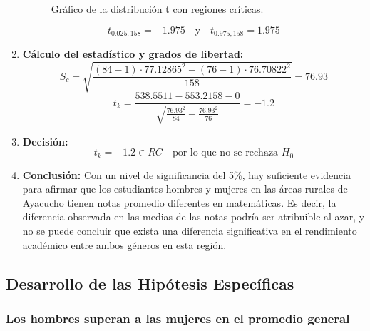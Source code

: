 \documentclass[
]{article}
\begin{document}
\begin{enumerate}
\begin{figure}[ht]
        \caption{Gráfico de la distribución t con regiones críticas.}
    \end{figure}
    \[
    t_{0.025, 158} = -1.975 \quad \text{y} \quad t_{0.975, 158} = 1.975
    \]
    \item \textbf{Cálculo del estadístico y grados de libertad:}
    \[
    S_c = \sqrt{\frac{(84 - 1) \cdot 77.12865^2 + (76 - 1) \cdot 76.70822^2}{158}} = 76.93
    \]
    \[
    t_k = \frac{538.5511 - 553.2158 - 0}{\sqrt{\frac{76.93^2}{84} + \frac{76.93^2}{76}}} = -1.2
    \]
    \item \textbf{Decisión:}
    \[
    t_k = -1.2 \in RC \quad \text{por lo que no se rechaza } H_0
    \]

  \item \textbf{Conclusión:}
    Con un nivel de significancia del 5\%, hay suficiente evidencia para afirmar que los estudiantes hombres y mujeres en las áreas rurales de Ayacucho tienen notas promedio diferentes en matemáticas. Es decir, la diferencia observada en las medias de las notas podría ser atribuible al azar, y no se puede concluir que exista una diferencia significativa en el rendimiento académico entre ambos géneros en esta región.
    
\end{enumerate}

\subsection*{Desarrollo de las Hipótesis
Específicas}\label{desarrollo-de-las-hipuxf3tesis-especuxedficas}

\subsubsection*{Los hombres superan a las mujeres en el promedio
general}\label{los-hombres-superan-a-las-mujeres-en-el-promedio-general}
\end{document}
